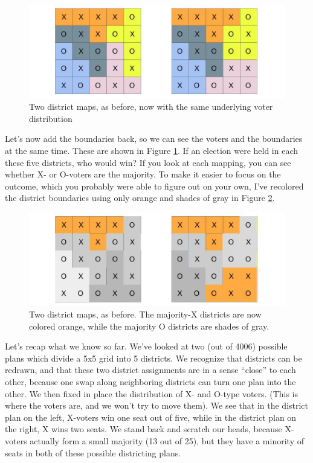 \documentclass[
  openany]{book}
\begin{document}
\begin{figure}

{\centering \includegraphics[width=0.8\linewidth]{images/gerrymandering5x5_3} 

}

\caption{Two district maps, as before, now with the same underlying voter distribution}\label{fig:gerrymandering-5x5-3}
\end{figure}

Let's now add the boundaries back, so we can see the voters and the boundaries at the same time. These are shown in Figure \ref{fig:gerrymandering-5x5-3}. If an election were held in each these five districts, who would win? If you look at each mapping, you can see whether X- or O-voters are the majority. To make it easier to focus on the outcome, which you probably were able to figure out on your own, I've recolored the district boundaries using only orange and shades of gray in Figure \ref{fig:gerrymandering-5x5-4}.

\begin{figure}

{\centering \includegraphics[width=0.8\linewidth]{images/gerrymandering5x5_4} 

}

\caption{Two district maps, as before. The majority-X districts are now colored orange, while the majority O districts are shades of gray.}\label{fig:gerrymandering-5x5-4}
\end{figure}

Let's recap what we know so far. We've looked at two (out of 4006) possible plans which divide a 5x5 grid into 5 districts. We recognize that districts can be redrawn, and that these two district assignments are in a sense ``close'' to each other, because one swap along neighboring districts can turn one plan into the other. We then fixed in place the distribution of X- and O-type voters. (This is where the voters are, and we won't try to move them). We see that in the district plan on the left, X-voters win one seat out of five, while in the district plan on the right, X wins two seats. We stand back and scratch our heads, because X-voters actually form a small majority (13 out of 25), but they have a minority of seats in both of these possible districting plans.
\end{document}
